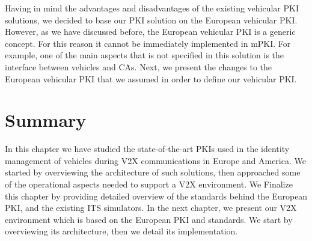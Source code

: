 Having in mind the advantages and disadvantages of the existing vehicular PKI solutions, we decided to base our PKI solution on the European vehicular PKI. However, as we have discussed before, the European vehicular PKI is a generic concept. For this reason it cannot be immediately implemented in mPKI. For example, one of the main aspects that is not specified in this solution is the interface between vehicles and CAs. Next, we present the changes to the European vehicular PKI that we assumed in order to define our vehicular PKI.

\section{Summary}
In this chapter we have studied the state-of-the-art PKIs used in the identity management of vehicles during V2X communications in Europe and America. We started by overviewing the architecture of such solutions, then approached some of the operational aspects needed to support a V2X environment. We Finalize this chapter by providing detailed overview of the standards behind the European PKI, and the existing ITS simulators. In the next chapter, we present our V2X environment which is based on the European PKI and standards. We start by overviewing its architecture, then we detail its implementation.